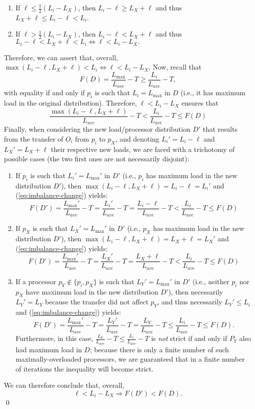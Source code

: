 \begin{enumerate}
\item
If $\ell \le \frac{1}{2}(L_i-L_X)$, then $L_i-\ell\ge{}L_X+\ell$ and
thus $L_X+\ell\le L_i-\ell < L_i$.
\item
If $\ell > \frac{1}{2}(L_i-L_X)$, then $L_i-\ell<L_X+\ell$ and
thus $L_i-\ell < L_X+\ell < L_i \Leftrightarrow \ell < L_i - L_X.$
\end{enumerate}
Therefore, we can assert that, overall,
$\max{(L_i-\ell, L_X+\ell)} < L_i \Leftrightarrow \ell < L_i - L_X$.
Now, recall that
\[
F(D) = \frac{L_{\max}}{L_{ave}} - T
\ge \frac{L_i}{L_{ave}} - T,
\]
with equality if and only if $p_i$ is such that $L_i=L_{\max}$ in $D$
(i.e., it has maximum load in the original distribution).
Therefore, $\ell<L_i-L_X$ ensures that
\begin{equation}
\label{eq:imbalance-change}
\frac{\max{(L_i-\ell, L_X+\ell)}}{L_{ave}} -T
< \frac{L_i}{L_{ave}} - T \le F(D)
\end{equation}
Finally, when considering the new load/processor distribution $D'$ that
results from the transfer of $O_i$ from $p_i$ to $p_X$, and denoting
$L_i'=L_i-\ell$ and $L_X'=L_X+\ell$ their respective new loads, we are faced
with a trichotomy of possible cases (the two first ones are not necessarily disjoint):
\begin{enumerate}
\item
If $p_i$ is such that $L_i'=L_{\max}'$ in $D'$ (i.e., $p_i$ has
maximum load in the new distribution $D'$), then
$\max{(L_i-\ell,L_X+\ell)}=L_i-\ell=L_i'$ and
(\ref{eq:imbalance-change}) yields: 
\[
F(D') = \frac{L_{\max}'}{L_{ave}} - T
 = \frac{L_i'}{L_{ave}} - T = \frac{L_i -\ell}{L_{ave}} - T
< \frac{L_i}{L_{ave}} - T \le F(D)
\]
\item
If $p_X$ is such that $L_X'=L_{\max}'$ in $D'$ (i.e., $p_X$ has
maximum load in the new distribution $D'$), then
$\max{(L_i-\ell,L_X+\ell)}=L_X+\ell=L_X'$ and
(\ref{eq:imbalance-change}) yields: 
\[
F(D') = \frac{L_{\max}'}{L_{ave}} - T
 = \frac{L_X'}{L_{ave}} - T  = \frac{L_X+\ell}{L_{ave}} - T
< \frac{L_i}{L_{ave}} - T \le F(D)
\]
\item 
If a processor $p_Y\not\in\{p_i,p_X\}$ is such that $L_Y'=L_{\max}'$
in $D'$ (i.e., neither $p_i$ nor $p_X$ have maximum load in the new
distribution $D'$), then necessarily $L_Y'=L_Y$ because the transfer did not
affect $p_Y$, and thus necessarily $L_Y'\le{}L_i$ and
(\ref{eq:imbalance-change}) yields: 
\[
F(D') = \frac{L_{\max}'}{L_{ave}} - T
 = \frac{L_Y'}{L_{ave}} - T  = \frac{L_Y}{L_{ave}} - T
\le \frac{L_i}{L_{ave}} - T \le F(D).
\]
Furthermore, in this case, 
$\frac{L_Y}{L_{ave}}-T\le\frac{L_i}{L_{ave}}-T$ is \emph{not} strict
if and only if $P_Y$ also had maximum load in $D$; because there is
only a finite number of such maximally-overloaded processors, we are
guaranteed that in a finite number of iterations the inequality will
become strict.
\end{enumerate}
We can therefore conclude that, overall,
\[
\ell < L_i - L_X \Longrightarrow F(D') < F(D).
\]
\hfill\qed\\

